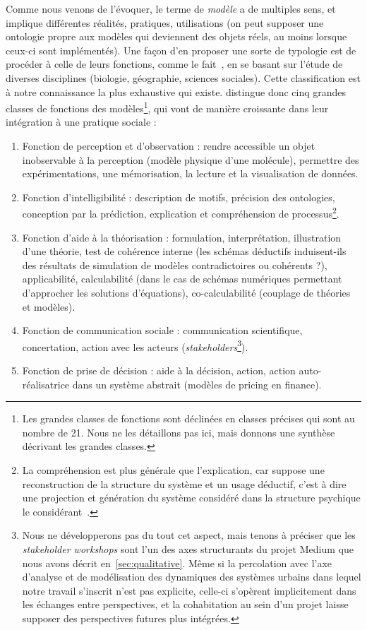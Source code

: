 Comme nous venons de l'évoquer, le terme de \emph{modèle} a de multiples sens, et implique différentes réalités, pratiques, utilisations (on peut supposer une ontologie propre aux modèles qui deviennent des objets réels, au moins lorsque ceux-ci sont implémentés). Une façon d'en proposer une sorte de typologie est de procéder à celle de leurs fonctions, comme le fait~\cite{varenne2017theories}, en se basant sur l'étude de diverses disciplines (biologie, géographie, sciences sociales). Cette classification est à notre connaissance la plus exhaustive qui existe.  distingue donc cinq grandes classes de fonctions des modèles\footnote{Les grandes classes de fonctions sont déclinées en classes précises qui sont au nombre de 21. Nous ne les détaillons pas ici, mais donnons une synthèse décrivant les grandes classes.}, qui vont de manière croissante dans leur intégration à une pratique sociale : 
\begin{enumerate}
	\item Fonction de perception et d'observation : rendre accessible un objet inobservable à la perception (modèle physique d'une molécule), permettre des expérimentations, une mémorisation, la lecture et la visualisation de données.
	\item Fonction d'intelligibilité : description de motifs, précision des ontologies, conception par la prédiction, explication et compréhension de processus\footnote{La compréhension est plus générale que l'explication, car suppose une reconstruction de la structure du système et un usage déductif, c'est à dire une projection et génération du système considéré dans la structure psychique le considérant~\cite{morin1980methode}.}.
	\item Fonction d'aide à la théorisation : formulation, interprétation, illustration d'une théorie, test de cohérence interne (les schémas déductifs induisent-ils des résultats de simulation de modèles contradictoires ou cohérents ?), applicabilité, calculabilité (dans le cas de schémas numériques permettant d'approcher les solutions d'équations), co-calculabilité (couplage de théories et modèles).
	\item Fonction de communication sociale : communication scientifique, concertation, action avec les acteurs (\emph{stakeholders}\footnote{Nous ne développerons pas du tout cet aspect, mais tenons à préciser que les \emph{stakeholder workshops} sont l'un des axes structurants du projet Medium que nous avons décrit en~\ref{sec:qualitative}. Même si la percolation avec l'axe d'analyse et de modélisation des dynamiques des systèmes urbains dans lequel notre travail s'inscrit n'est pas explicite, celle-ci s'opèrent implicitement dans les échanges entre perspectives, et la cohabitation au sein d'un projet laisse supposer des perspectives futures plus intégrées.}).
	\item Fonction de prise de décision : aide à la décision, action, action auto-réalisatrice dans un système abstrait (modèles de pricing en finance).
\end{enumerate}

